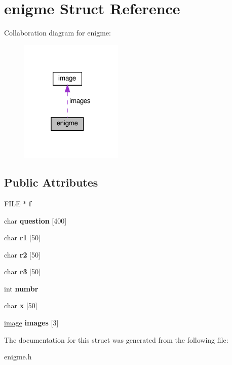 \hypertarget{structenigme}{}\section{enigme Struct Reference}
\label{structenigme}


Collaboration diagram for enigme\+:
\nopagebreak
\begin{figure}[H]
\begin{center}
\leavevmode
\includegraphics[width=139pt]{structenigme__coll__graph}
\end{center}
\end{figure}
\subsection*{Public Attributes}
\begin{DoxyCompactItemize}
\item 
\mbox{\label{structenigme_a9ce33d500de045fd29a8aa61c2fc0e1f}} 
F\+I\+LE $\ast$ {\bfseries f}
\item 
\mbox{\label{structenigme_a61fb9714193b13f287db89d7c4c28740}} 
char {\bfseries question} \mbox{[}400\mbox{]}
\item 
\mbox{\label{structenigme_ab8ad9d1dd77fd405f1a4902afb556ba9}} 
char {\bfseries r1} \mbox{[}50\mbox{]}
\item 
\mbox{\label{structenigme_a69e2c99402f8552d706889398269fb02}} 
char {\bfseries r2} \mbox{[}50\mbox{]}
\item 
\mbox{\label{structenigme_a0be499a1cab137aeaa3d66f50943519a}} 
char {\bfseries r3} \mbox{[}50\mbox{]}
\item 
\mbox{\label{structenigme_a80220d6d98c393b8bcbc56b59f3cb933}} 
int {\bfseries numbr}
\item 
\mbox{\label{structenigme_afdb7d50bf0ba237f70ca82f840583682}} 
char {\bfseries x} \mbox{[}50\mbox{]}
\item 
\mbox{\label{structenigme_a8b8952fa6e5b4361aa8a1c834dc0de5b}} 
\hyperlink{structimage}{image} {\bfseries images} \mbox{[}3\mbox{]}
\end{DoxyCompactItemize}


The documentation for this struct was generated from the following file\+:\begin{DoxyCompactItemize}
\item 
enigme.\+h\end{DoxyCompactItemize}

